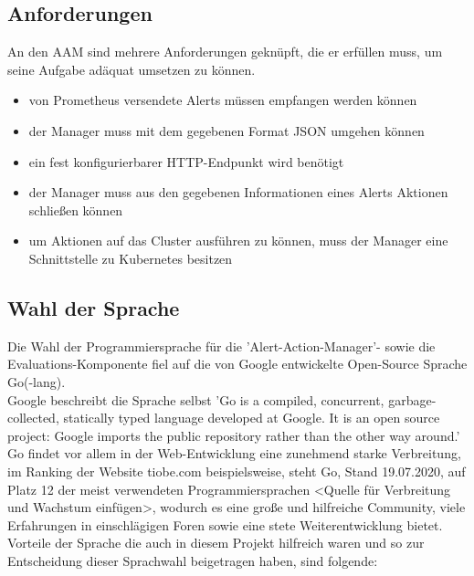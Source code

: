 \documentclass[a4paper,10pt]{scrartcl}
\begin{document}
\subsection{Anforderungen}

An den AAM sind mehrere Anforderungen geknüpft, die er erfüllen muss, um seine Aufgabe adäquat umsetzen zu können.

\begin{itemize}
\item von Prometheus versendete Alerts müssen empfangen werden können
\item der Manager muss mit dem gegebenen Format JSON umgehen können
\item ein fest konfigurierbarer HTTP-Endpunkt wird benötigt
\item der Manager muss  aus den gegebenen Informationen eines Alerts Aktionen schließen können
\item um Aktionen auf das Cluster ausführen zu können, muss der Manager eine Schnittstelle zu Kubernetes besitzen
\end{itemize}

\subsection{Wahl der Sprache}

Die Wahl der Programmiersprache für die 'Alert-Action-Manager'- sowie die Evaluations-Komponente fiel auf die von Google entwickelte Open-Source Sprache Go(-lang).\\
Google beschreibt die Sprache selbst 'Go is a compiled, concurrent, garbage-collected, statically typed language developed at Google. It is an open source project: Google imports the public repository rather than the other way around.'
Go findet vor allem in der Web-Entwicklung eine zunehmend starke Verbreitung, im Ranking der Website tiobe.com beispielsweise, steht Go, Stand 19.07.2020, auf Platz 12 der meist verwendeten Programmiersprachen <Quelle für Verbreitung und Wachstum einfügen>, wodurch es eine große und hilfreiche Community, viele Erfahrungen in einschlägigen Foren sowie eine stete Weiterentwicklung bietet.\\
Vorteile der Sprache die auch in diesem Projekt hilfreich waren und so zur Entscheidung dieser Sprachwahl beigetragen haben, sind folgende:
\end{document}
